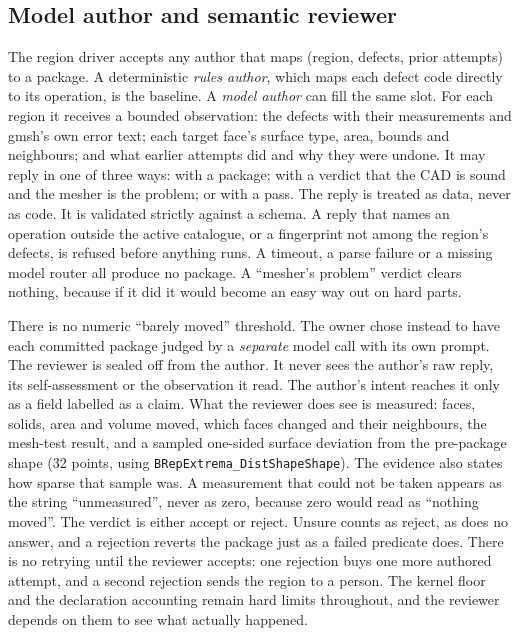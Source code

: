 \documentclass[11pt,onecolumn]{article}
\newcommand{\code}[1]{\texttt{\small #1}}
\begin{document}
\subsection{Model author and semantic reviewer}\label{sec:model}
The region driver accepts any author that maps (region, defects, prior attempts) to a package. A
deterministic \emph{rules author}, which maps each defect code directly to its operation, is the
baseline. A \emph{model author} can fill the same slot. For each region it receives a bounded
observation: the defects with their measurements and gmsh's own error text; each target face's
surface type, area, bounds and neighbours; and what earlier attempts did and why they were undone.
It may reply in one of three ways: with a package; with a verdict that the CAD is sound and the
mesher is the problem; or with a pass. The reply is treated as data, never as code. It is validated
strictly against a schema. A reply that names an operation outside the active catalogue, or a
fingerprint not among the region's defects, is refused before anything runs. A timeout, a parse
failure or a missing model router all produce no package. A ``mesher's problem'' verdict clears
nothing, because if it did it would become an easy way out on hard parts.

There is no numeric ``barely moved'' threshold. The owner chose instead to have each committed
package judged by a \emph{separate} model call with its own prompt. The reviewer is sealed off from
the author. It never sees the author's raw reply, its self-assessment or the observation it read.
The author's intent reaches it only as a field labelled as a claim. What the reviewer does see is
measured: faces, solids, area and volume moved, which faces changed and their neighbours, the
mesh-test result, and a sampled one-sided surface deviation from the pre-package shape (32 points,
using \code{BRepExtrema\_DistShapeShape}). The evidence also states how sparse that sample was. A
measurement that could not be taken appears as the string ``unmeasured'', never as zero, because
zero would read as ``nothing moved''. The verdict is either accept or reject. Unsure counts as
reject, as does no answer, and a rejection reverts the package just as a failed predicate does.
There is no retrying until the reviewer accepts: one rejection buys one more authored attempt, and a
second rejection sends the region to a person. The kernel floor and the declaration accounting
remain hard limits throughout, and the reviewer depends on them to see what actually happened.
\end{document}
